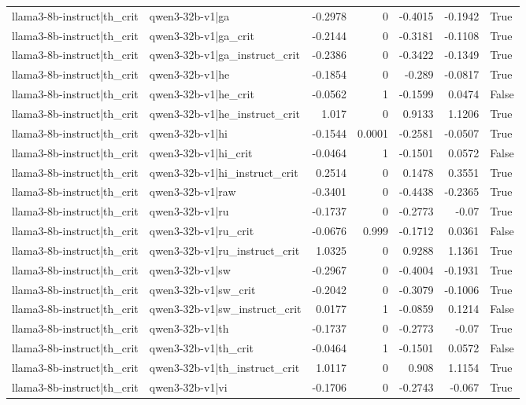 \begin{table}
\begin{tabular}{l l r r r r l}
llama3-8b-instruct|th_crit & qwen3-32b-v1|ga & -0.2978 & 0 & -0.4015 & -0.1942 & True \\
llama3-8b-instruct|th_crit & qwen3-32b-v1|ga_crit & -0.2144 & 0 & -0.3181 & -0.1108 & True \\
llama3-8b-instruct|th_crit & qwen3-32b-v1|ga_instruct_crit & -0.2386 & 0 & -0.3422 & -0.1349 & True \\
llama3-8b-instruct|th_crit & qwen3-32b-v1|he & -0.1854 & 0 & -0.289 & -0.0817 & True \\
llama3-8b-instruct|th_crit & qwen3-32b-v1|he_crit & -0.0562 & 1 & -0.1599 & 0.0474 & False \\
llama3-8b-instruct|th_crit & qwen3-32b-v1|he_instruct_crit & 1.017 & 0 & 0.9133 & 1.1206 & True \\
llama3-8b-instruct|th_crit & qwen3-32b-v1|hi & -0.1544 & 0.0001 & -0.2581 & -0.0507 & True \\
llama3-8b-instruct|th_crit & qwen3-32b-v1|hi_crit & -0.0464 & 1 & -0.1501 & 0.0572 & False \\
llama3-8b-instruct|th_crit & qwen3-32b-v1|hi_instruct_crit & 0.2514 & 0 & 0.1478 & 0.3551 & True \\
llama3-8b-instruct|th_crit & qwen3-32b-v1|raw & -0.3401 & 0 & -0.4438 & -0.2365 & True \\
llama3-8b-instruct|th_crit & qwen3-32b-v1|ru & -0.1737 & 0 & -0.2773 & -0.07 & True \\
llama3-8b-instruct|th_crit & qwen3-32b-v1|ru_crit & -0.0676 & 0.999 & -0.1712 & 0.0361 & False \\
llama3-8b-instruct|th_crit & qwen3-32b-v1|ru_instruct_crit & 1.0325 & 0 & 0.9288 & 1.1361 & True \\
llama3-8b-instruct|th_crit & qwen3-32b-v1|sw & -0.2967 & 0 & -0.4004 & -0.1931 & True \\
llama3-8b-instruct|th_crit & qwen3-32b-v1|sw_crit & -0.2042 & 0 & -0.3079 & -0.1006 & True \\
llama3-8b-instruct|th_crit & qwen3-32b-v1|sw_instruct_crit & 0.0177 & 1 & -0.0859 & 0.1214 & False \\
llama3-8b-instruct|th_crit & qwen3-32b-v1|th & -0.1737 & 0 & -0.2773 & -0.07 & True \\
llama3-8b-instruct|th_crit & qwen3-32b-v1|th_crit & -0.0464 & 1 & -0.1501 & 0.0572 & False \\
llama3-8b-instruct|th_crit & qwen3-32b-v1|th_instruct_crit & 1.0117 & 0 & 0.908 & 1.1154 & True \\
llama3-8b-instruct|th_crit & qwen3-32b-v1|vi & -0.1706 & 0 & -0.2743 & -0.067 & True \\

\end{tabular}
\end{table}
